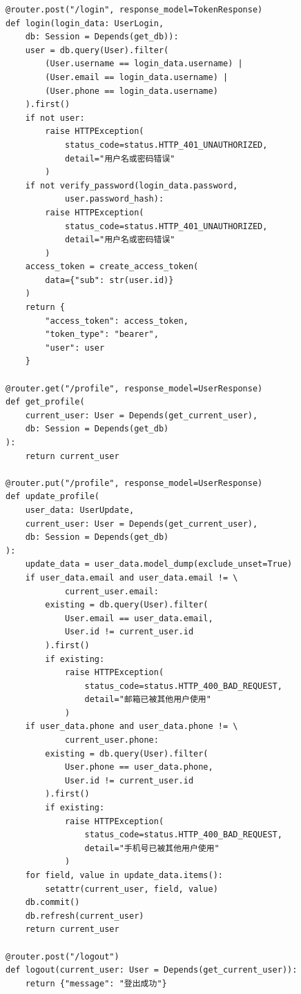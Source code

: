 \documentclass[a4paper,10pt]{article}
\begin{document}
\begin{lstlisting}
@router.post("/login", response_model=TokenResponse)
def login(login_data: UserLogin,
    db: Session = Depends(get_db)):
    user = db.query(User).filter(
        (User.username == login_data.username) |
        (User.email == login_data.username) |
        (User.phone == login_data.username)
    ).first()
    if not user:
        raise HTTPException(
            status_code=status.HTTP_401_UNAUTHORIZED,
            detail="用户名或密码错误"
        )
    if not verify_password(login_data.password,
            user.password_hash):
        raise HTTPException(
            status_code=status.HTTP_401_UNAUTHORIZED,
            detail="用户名或密码错误"
        )
    access_token = create_access_token(
        data={"sub": str(user.id)}
    )
    return {
        "access_token": access_token,
        "token_type": "bearer",
        "user": user
    }

@router.get("/profile", response_model=UserResponse)
def get_profile(
    current_user: User = Depends(get_current_user),
    db: Session = Depends(get_db)
):
    return current_user

@router.put("/profile", response_model=UserResponse)
def update_profile(
    user_data: UserUpdate,
    current_user: User = Depends(get_current_user),
    db: Session = Depends(get_db)
):
    update_data = user_data.model_dump(exclude_unset=True)
    if user_data.email and user_data.email != \
            current_user.email:
        existing = db.query(User).filter(
            User.email == user_data.email,
            User.id != current_user.id
        ).first()
        if existing:
            raise HTTPException(
                status_code=status.HTTP_400_BAD_REQUEST,
                detail="邮箱已被其他用户使用"
            )
    if user_data.phone and user_data.phone != \
            current_user.phone:
        existing = db.query(User).filter(
            User.phone == user_data.phone,
            User.id != current_user.id
        ).first()
        if existing:
            raise HTTPException(
                status_code=status.HTTP_400_BAD_REQUEST,
                detail="手机号已被其他用户使用"
            )
    for field, value in update_data.items():
        setattr(current_user, field, value)
    db.commit()
    db.refresh(current_user)
    return current_user

@router.post("/logout")
def logout(current_user: User = Depends(get_current_user)):
    return {"message": "登出成功"}
\end{lstlisting}
\end{document}
